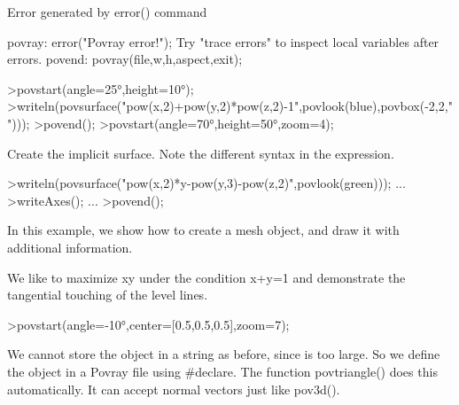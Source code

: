 \documentclass[a4paper,10pt]{article}
\begin{document}
\begin{eulernotebook}
\begin{euleroutput}
  Error generated by error() command
  
  povray:
      error("Povray error!");
  Try "trace errors" to inspect local variables after errors.
  povend:
      povray(file,w,h,aspect,exit); 
\end{euleroutput}
\begin{eulerprompt}
>povstart(angle=25°,height=10°); 
>writeln(povsurface("pow(x,2)+pow(y,2)*pow(z,2)-1",povlook(blue),povbox(-2,2,"")));
>povend();
>povstart(angle=70°,height=50°,zoom=4);
\end{eulerprompt}
\begin{eulercomment}
Create the implicit surface. Note the different syntax in the
expression.
\end{eulercomment}
\begin{eulerprompt}
>writeln(povsurface("pow(x,2)*y-pow(y,3)-pow(z,2)",povlook(green))); ...
>writeAxes(); ...
>povend();
\end{eulerprompt}
\begin{eulercomment}
In this example, we show how to create a mesh object, and draw it with additional information.

We like to maximize xy under the condition x+y=1 and demonstrate the tangential touching of the level lines.
\end{eulercomment}
\begin{eulerprompt}
>povstart(angle=-10°,center=[0.5,0.5,0.5],zoom=7);
\end{eulerprompt}
\begin{eulercomment}
We cannot store the object in a string as before, since is too large. So we define the object in a Povray file using
#declare. The function povtriangle() does this automatically. It can accept normal vectors just like pov3d().


\end{eulercomment}
\end{eulernotebook}
\end{document}
